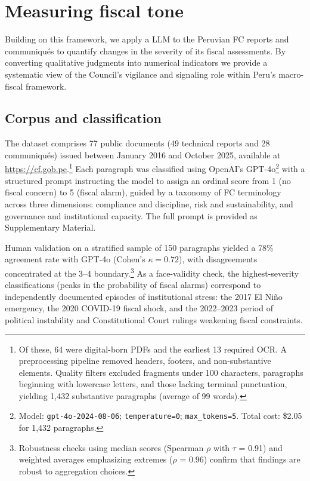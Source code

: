 \documentclass[a4paper, fleqn, 12pt]{article}
\begin{document}



\section{Measuring fiscal tone}

Building on this framework, we apply a LLM to the Peruvian FC reports and communiqués to quantify changes in the severity of its fiscal assessments. By converting qualitative judgments into numerical indicators we provide a systematic view of the Council’s vigilance and signaling role within Peru’s macro-fiscal framework.

\subsection{Corpus and classification}

The dataset comprises 77 public documents (49 technical reports and 28 communiqu\'{e}s) issued between January 2016 and October 2025, available at \url{https://cf.gob.pe}.\footnote{Of these, 64 were digital-born PDFs and the earliest 13 required OCR. A preprocessing pipeline removed headers, footers, and non-substantive elements. Quality filters excluded fragments under 100 characters, paragraphs beginning with lowercase letters, and those lacking terminal punctuation, yielding 1,432 substantive paragraphs (average of 99 words).} Each paragraph was classified using OpenAI's GPT-4o\footnote{Model: \texttt{gpt-4o-2024-08-06}; \texttt{temperature=0}; \texttt{max\_tokens=5}. Total cost: \$2.05 for 1,432 paragraphs.} with a structured prompt instructing the model to assign an ordinal score from 1 (no fiscal concern) to 5 (fiscal alarm), guided by a taxonomy of FC terminology across three dimensions: compliance and discipline, risk and sustainability, and governance and institutional capacity. The full prompt is provided as Supplementary Material.

Human validation on a stratified sample of 150 paragraphs yielded a 78\% agreement rate with GPT-4o (Cohen's $\kappa = 0.72$), with disagreements concentrated at the 3--4 boundary.\footnote{Robustness checks using median scores (Spearman $\rho$ with $\tau$ = 0.91) and weighted averages emphasizing extremes ($\rho$ = 0.96) confirm that findings are robust to aggregation choices.} As a face-validity check, the highest-severity classifications (peaks in the probability of fiscal alarms) correspond to independently documented episodes of institutional stress: the 2017 El Ni\~{n}o emergency, the 2020 COVID-19 fiscal shock, and the 2022--2023 period of political instability and Constitutional Court rulings weakening fiscal constraints.
\end{document}
